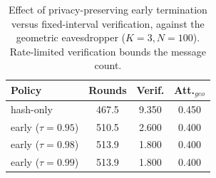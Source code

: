\begin{table}[t]
\centering
\caption{Effect of privacy-preserving early termination versus fixed-interval verification, against the geometric eavesdropper ($K{=}3,N{=}100$). Rate-limited verification bounds the message count.}
\label{tab:earlyterm}
\begin{tabular}{lccc}
\toprule
Policy & Rounds & Verif. & Att.$_{geo}$ \\
\midrule
hash-only & 467.5 & 9.350 & 0.450 \\
early ($\tau{=}0.95$) & 510.5 & 2.600 & 0.400 \\
early ($\tau{=}0.98$) & 513.9 & 1.800 & 0.400 \\
early ($\tau{=}0.99$) & 513.9 & 1.800 & 0.400 \\
\bottomrule
\end{tabular}
\end{table}
